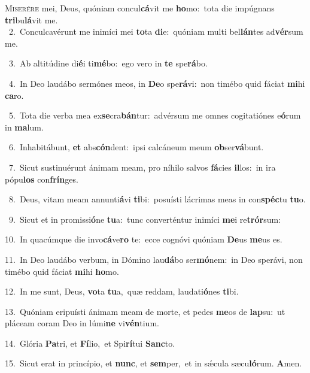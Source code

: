 \lettrine{\initial\textcolor{\initialcolor}{M}}{iserére} mei, Deus, quóniam concul\-\textbf{cá}\-vit me \textbf{ho}\-mo:~\star tota die impúgnans \textbf{tri}\-bu\-\textbf{lá}\-vit me.\\
{\numbfont\textcolor{\numbcolor}{~2.}}~Conculcavérunt me inimíci mei \textbf{to}\-ta \textbf{di}\-e:~\star quóniam multi bel\-\textbf{lán}\-tes ad\-\textbf{vér}\-sum me.\par
{\numbfont\textcolor{\numbcolor}{~3.}}~Ab altitúdine di\-\textbf{é}\-i ti\-\textbf{mé}\-bo:~\star ego vero in \textbf{te} spe\-\textbf{rá}\-bo.\par
{\numbfont\textcolor{\numbcolor}{~4.}}~In Deo laudábo sermónes meos, in \textbf{De}\-o spe\-\textbf{rá}\-vi:~\star non timébo quid fáciat \textbf{mi}\-hi \textbf{ca}\-ro.\par
{\numbfont\textcolor{\numbcolor}{~5.}}~Tota die verba mea ex\-\textbf{se}\-cra\-\textbf{bán}\-tur:~\star advérsum me omnes cogitatiónes e\-\textbf{ó}\-rum in \textbf{ma}\-lum.\par
{\numbfont\textcolor{\numbcolor}{~6.}}~Inhabitábunt, \textbf{et} abs\-\textbf{cón}\-dent:~\star ipsi calcáneum meum \textbf{ob}\-ser\-\textbf{vá}\-bunt.\par
{\numbfont\textcolor{\numbcolor}{~7.}}~Sicut sustinuérunt ánimam meam, pro níhilo salvos \textbf{fá}\-cies \textbf{il}\-los:~\star in ira pópu\textbf{los} con\-\textbf{frín}\-ges.\par
{\numbfont\textcolor{\numbcolor}{~8.}}~Deus, vitam meam annunti\-\textbf{á}\-vi \textbf{ti}\-bi:~\star posuísti lácrimas meas in con\-\textbf{spéc}\-tu \textbf{tu}\-o.\par
{\numbfont\textcolor{\numbcolor}{~9.}}~Sicut et in promissi\-\textbf{ó}\-ne \textbf{tu}\-a:~\star tunc converténtur inimíci \textbf{me}\-i re\-\textbf{trór}\-sum:\par
{\numbfont\textcolor{\numbcolor}{10.}}~In quacúmque die invo\-\textbf{cá}\-ve\textbf{ro} te:~\star ecce cognóvi quóniam \textbf{De}\-us \textbf{me}\-us es.\par
{\numbfont\textcolor{\numbcolor}{11.}}~In Deo laudábo verbum, in Dómino lau\-\textbf{dá}\-bo ser\-\textbf{mó}\-nem:~\star in Deo sperávi, non timébo quid fáciat \textbf{mi}\-hi \textbf{ho}\-mo.\par
{\numbfont\textcolor{\numbcolor}{12.}}~In me sunt, Deus, \textbf{vo}\-ta \textbf{tu}\-a,~\star quæ reddam, laudati\-\textbf{ó}\-nes \textbf{ti}\-bi.\par
{\numbfont\textcolor{\numbcolor}{13.}}~Quóniam eripuísti ánimam meam de morte, et pedes \textbf{me}\-os de \textbf{lap}\-su:~\star ut pláceam coram Deo in lúmi\textbf{ne} vi\-\textbf{vén}\-tium.\par
{\numbfont\textcolor{\numbcolor}{14.}}~Glória \textbf{Pa}\-tri, et \textbf{Fí}\-lio,~\star et Spi\-\textbf{rí}\-tui \textbf{Sanc}\-to.\par
{\numbfont\textcolor{\numbcolor}{15.}}~Sicut erat in princípio, et \textbf{nunc}\-, et \textbf{sem}\-per,~\star et in sǽcula sæcu\-\textbf{ló}\-rum. \textbf{A}\-men.\par
